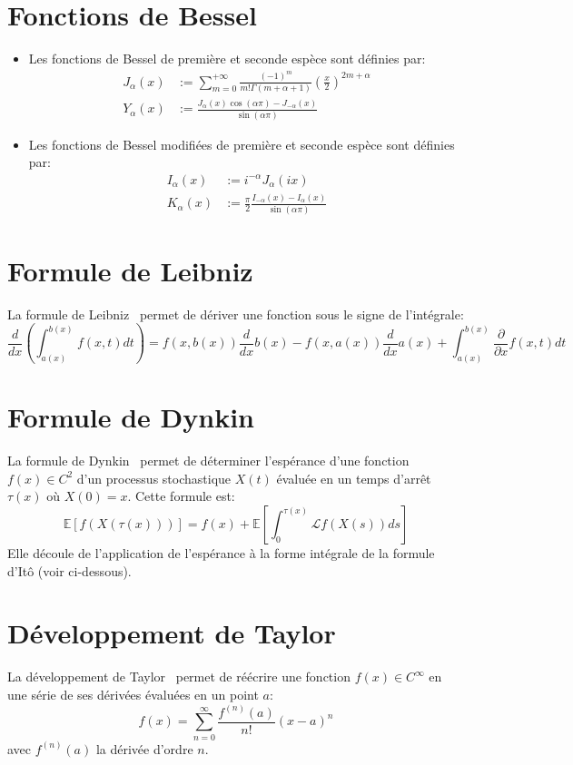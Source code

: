 \section*{Fonctions de Bessel}
\begin{itemize}
    \item Les fonctions de Bessel de première et seconde espèce sont définies par:
    \[
    \begin{aligned}
        J_\alpha(x)&:=\sum_{m=0}^{+\infty}\frac{(-1)^m}{m!\Gamma(m+\alpha+1)}{\left(\frac{x}{2}\right)}^{2m+\alpha} \\
        Y_\alpha(x)&:=\frac{J_\alpha(x)\cos(\alpha\pi)-J_{-\alpha}(x)}{\sin(\alpha\pi)}
    \end{aligned}
    \]
    \item Les fonctions de Bessel modifiées de première et seconde espèce sont définies par:
    \[
    \begin{aligned}
        I_\alpha(x)&:=i^{-\alpha}J_\alpha(ix)\\
        K_\alpha(x)&:=\frac{\pi}{2}\frac{I_{-\alpha}(x)-I_\alpha(x)}{\sin(\alpha\pi)}
    \end{aligned}
    \]
\end{itemize}

\label{special_formulas}

\section*{Formule de Leibniz}
La formule de Leibniz~\cite{abramowitz1964} permet de dériver une fonction sous le signe de l'intégrale:
\[
\frac{d}{dx}\left(\int_{a(x)}^{b(x)}f(x,t)dt\right)=f(x,b(x))\frac{d}{dx}b(x)-f(x,a(x))\frac{d}{dx}a(x)+\int_{a(x)}^{b(x)}\frac{\partial}{\partial x}f(x,t)dt
\]

\section*{Formule de Dynkin}
La formule de Dynkin~\cite{dynkin1965} permet de déterminer l'espérance d'une fonction \(f(x)\in C^2\) d'un processus stochastique \(X(t)\) évaluée en un temps d'arrêt \(\tau(x)\) où \(X(0)=x\). Cette formule est:
\[
\mathds{E}[f(X(\tau(x)))]=f(x)+\mathds{E}\left[\int_0^{\tau(x)}\mathcal{L}f(X(s))ds\right]
\]
Elle découle de l'application de l'espérance à la forme intégrale de la formule d'Itô (voir ci-dessous).

\section*{Développement de Taylor}
La développement de Taylor~\cite{banner2007} permet de réécrire une fonction \(f(x)\in C^\infty\) en une série de ses dérivées évaluées en un point \(a\):
\[
f(x)=\sum_{n=0}^\infty\frac{f^{(n)}(a)}{n!}{(x-a)}^n
\]
avec \(f^{(n)}(a)\) la dérivée d'ordre $n$.

